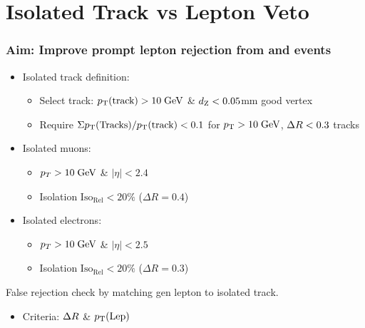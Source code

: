 \documentclass{beamer}
\begin{document}
\section{Isolated Track vs Lepton Veto }
\begin{frame}
\frametitle{Aim: Improve prompt lepton rejection from  \ttbar and \wpj events}
 \begin{itemize}
  \item Isolated track definition:
  \begin{itemize}
  \item Select track: $p_{\text{T}}(\text{track})>10\;\text{Ge}\kern-0.06667em\text{V}$ \& $d_{\text{Z}}<0.05$mm good vertex
   \item Require $\Sigma p_{\text{T}}(\text{Tracks})/p_{\text{T}}(\text{track})<0.1$ for $p_{\text{T}}>10\;\text{Ge}\kern-0.06667em\text{V}$, $\Delta R<0.3$ tracks
  \end{itemize}
  \item Isolated muons:
  \begin{itemize}
   \item $p_{T}>10 \;\text{Ge}\kern-0.06667em\text{V}$ \& $|\eta|<2.4$
   \item  Isolation $\text{Iso}_{\text{Rel}}<20\%$ ($\Delta R=0.4$)
  \end{itemize}
    \item Isolated electrons:
  \begin{itemize}
   \item $p_{T}>10 \;\text{Ge}\kern-0.06667em\text{V}$ \& $|\eta|<2.5$
   \item  Isolation $\text{Iso}_{\text{Rel}}<20\%$ ($\Delta R=0.3$)
  \end{itemize}

 \end{itemize}
 False rejection check by matching gen lepton to isolated track.
 \begin{itemize}
  \item Criteria: $\Delta R$ \& $p_{\text{T}}(\text{Lep})$
 \end{itemize}


\end{frame}



\end{document}
